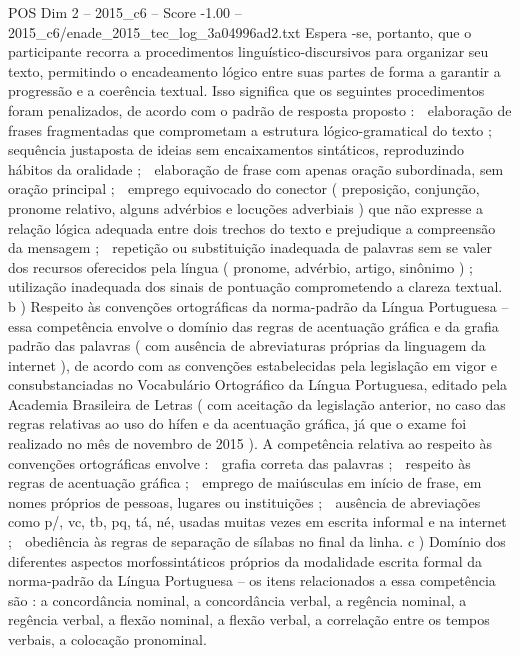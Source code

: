 \begin{textsample}{POS Dim 2 – 2015\_c6 – Score -1.00 – 2015\_c6/enade\_2015\_tec\_log\_3a04996ad2.txt}
Espera -se, portanto, que o participante recorra a procedimentos linguístico-discursivos para organizar seu texto, permitindo o encadeamento lógico entre suas partes de forma a garantir a progressão e a coerência textual.
Isso significa que os seguintes procedimentos foram penalizados, de acordo com o padrão de resposta proposto :  elaboração de frases fragmentadas que comprometam a estrutura lógico-gramatical do texto ;  sequência justaposta de ideias sem encaixamentos sintáticos, reproduzindo hábitos da oralidade ;  elaboração de frase com apenas oração subordinada, sem oração principal ;  emprego equivocado do conector ( preposição, conjunção, pronome relativo, alguns advérbios e locuções adverbiais ) que não expresse a relação lógica adequada entre dois trechos do texto e prejudique a compreensão da mensagem ;  repetição ou substituição inadequada de palavras sem se valer dos recursos oferecidos pela língua ( pronome, advérbio, artigo, sinônimo ) ;  utilização inadequada dos sinais de pontuação comprometendo a clareza textual. b ) Respeito às convenções ortográficas da norma-padrão da Língua Portuguesa – essa competência envolve o domínio das regras de acentuação gráfica e da grafia padrão das palavras ( com ausência de abreviaturas próprias da linguagem da internet ), de acordo com as convenções estabelecidas pela legislação em vigor e consubstanciadas no Vocabulário Ortográfico da Língua Portuguesa, editado pela Academia Brasileira de Letras ( com aceitação da legislação anterior, no caso das regras relativas ao uso do hífen e da acentuação gráfica, já que o exame foi realizado no mês de novembro de 2015 ).
A competência relativa ao respeito às convenções ortográficas envolve :  grafia correta das palavras ;  respeito às regras de acentuação gráfica ;  emprego de maiúsculas em início de frase, em nomes próprios de pessoas, lugares ou instituições ;  ausência de abreviações como p/, vc, tb, pq, tá, né, usadas muitas vezes em escrita informal e na internet ;  obediência às regras de separação de sílabas no final da linha. c ) Domínio dos diferentes aspectos morfossintáticos próprios da modalidade escrita formal da norma-padrão da Língua Portuguesa – os itens relacionados a essa competência são : a concordância nominal, a concordância verbal, a regência nominal, a regência verbal, a flexão nominal, a flexão verbal, a correlação entre os tempos verbais, a colocação pronominal.

\end{textsample}
